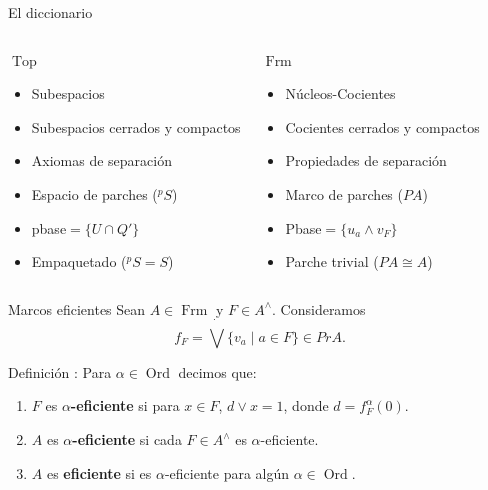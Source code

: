 \documentclass[compress,12pt]{beamer}
\DeclareMathOperator{\Frm}{Frm}
\DeclareMathOperator{\Top}{Top}
\DeclareMathOperator{\Ord}{Ord}
\begin{document}
\begin{frame}{El diccionario}

\begin{columns}[T,onlytextwidth]
  \begin{block}{\centering $\Top$}
    \begin{itemize}
      \item<2-> Subespacios
      \item<4-> Subespacios cerrados y compactos
      \item<6-> Axiomas de separación 
      \item<8-> Espacio de parches ($^pS$)
      \item<10-> pbase$=\{U\cap Q'\}$ 
      \item<12-> Empaquetado ($^pS=S$)
    \end{itemize}
  \end{block}

  \begin{block}{\centering $\Frm$}
    \begin{itemize}
      \item<3-> Núcleos-Cocientes
      \item<5-> Cocientes cerrados y compactos
      \item<7-> Propiedades de separación
      \item<9-> Marco de parches ($PA$)
      \item<11-> Pbase$=\{u_a\wedge v_F\}$
      \item<13-> Parche trivial ($PA\cong A$)
    \end{itemize}
  \end{block}
\end{columns}
\end{frame}

\begin{frame}{Marcos eficientes}
Sean $A\in \Frm$ y $F\in A^\wedge$. Consideramos
\[ 
f_F=\dot{\bigvee}\{v_a\mid a\in F\}\in PrA.
\]
\begin{block}{Definición \citep{sexton2006point}:}
Para $\alpha\in \Ord$ decimos que:
\begin{enumerate}
    \item<2-> $F$ es $\alpha$\textbf{-eficiente} si para $x\in F$, $d\vee x=1$, donde $d=f_F^\alpha(0)$.
    \item<3-> $A$ es $\alpha$\textbf{-eficiente} si cada $F\in A^\wedge$ es $\alpha$-eficiente.
    \item<4-> $A$ es \textbf{eficiente} si es $\alpha$-eficiente para algún $\alpha\in \Ord$.
\end{enumerate}
\end{block}

\end{frame}
\end{document}

